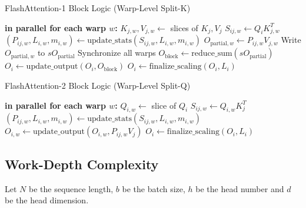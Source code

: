 \documentclass[11pt]{article}
\begin{document}
\begin{algorithm}[htbp]
\caption{FlashAttention-1 Block Logic (Warp-Level Split-K)}
\label{alg:flashattention1}
\begin{algorithmic}[1]
        \STATE \textbf{in parallel for each warp $w$:}
        \STATE \hspace{0.5cm} $K_{j,w}, V_{j,w} \gets$ slices of $K_j, V_j$
        \STATE \hspace{0.5cm} $S_{ij,w} \gets Q_i K_{j,w}^T$
        \STATE \hspace{0.5cm} $(P_{ij,w}, L_{i,w}, m_{i,w}) \gets \text{update\_stats}(S_{ij,w}, L_{i,w}, m_{i,w})$
        \STATE \hspace{0.5cm} $O_{\text{partial},w} \gets P_{ij,w} V_{j,w}$
        \STATE \hspace{0.5cm} Write $O_{\text{partial},w}$ to $sO_{\text{partial}}$
        \STATE Synchronize all warps
        \STATE $O_{\text{block}} \gets \text{reduce\_sum}(sO_{\text{partial}})$
        \STATE $O_i \gets \text{update\_output}(O_i, O_{\text{block}})$
    \ENDFOR
    \STATE $O_i \gets \text{finalize\_scaling}(O_i, L_i)$
\end{algorithmic}
\end{algorithm}


\begin{algorithm}[htbp]
\caption{FlashAttention-2 Block Logic (Warp-Level Split-Q)}
\label{alg:flashattention2}
\begin{algorithmic}[1]
        \STATE \textbf{in parallel for each warp $w$:}
        \STATE \hspace{0.5cm} $Q_{i,w} \gets$ slice of $Q_i$
        \STATE \hspace{0.5cm} $S_{ij,w} \gets Q_{i,w} K_j^T$
        \STATE \hspace{0.5cm} $(P_{ij,w}, L_{i,w}, m_{i,w}) \gets \text{update\_stats}(S_{ij,w}, L_{i,w}, m_{i,w})$
        \STATE \hspace{0.5cm} $O_{i,w} \gets \text{update\_output}(O_{i,w}, P_{ij,w} V_j)$
    \ENDFOR
    \STATE $O_i \gets \text{finalize\_scaling}(O_i, L_i)$
\end{algorithmic}
\end{algorithm}

\subsection{Work-Depth Complexity}
Let $N$ be the sequence length, $b$ be the batch size, $h$ be the head number and $d$ be the head dimension.
\end{document}
